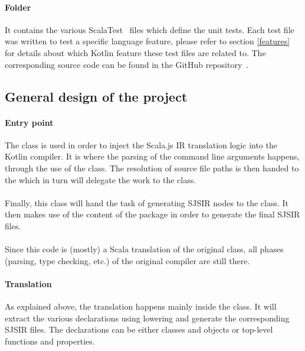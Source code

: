 \paragraph{Folder } It contains the various ScalaTest~\cite{scala_test} files 
which define the unit tests. Each test file was written to test a specific language feature, 
please refer to section \ref{features} for details about which Kotlin feature these test files are 
related to. The corresponding source code can be found in the GitHub 
repository~\cite{kotlin_scalajs_v2}.

\subsection*{General design of the project}

\paragraph{Entry point} The  class is used in order to inject the 
Scala.js IR translation logic into the Kotlin compiler. It is where the parsing of the 
command line arguments happens, through the use of the  class. The 
resolution of source file paths is then handed to the  which in turn 
will delegate the work to the  class.

\paragraph{} Finally, this class will hand the task of generating SJSIR nodes to the
 class. It then makes use of the content of the
 package in order to generate the final SJSIR files.

\paragraph{} Since this code is (mostly) a Scala translation of the original  
 class, all phases (parsing, type checking, etc.) of the original 
compiler are still there.


\label{translation}
\paragraph{Translation} As explained above, the translation happens mainly inside the 
 class. It will extract the various declarations using 
lowering and generate the corresponding SJSIR files. The declarations can be either classes and
objects or top-level functions and properties.

